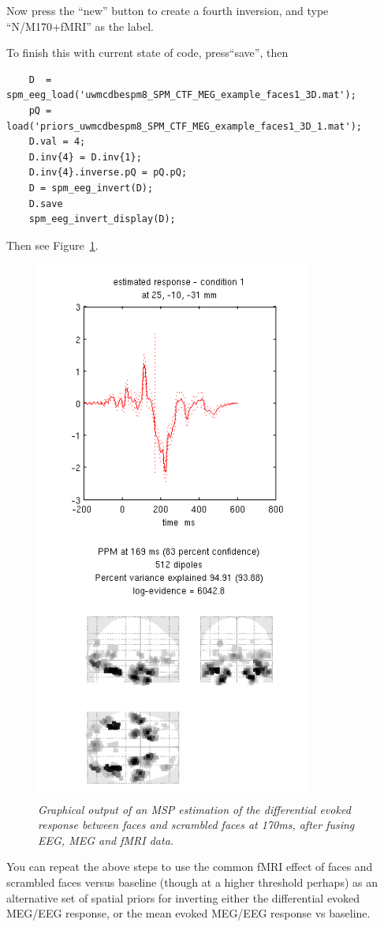 Now press the ``new'' button to create a fourth inversion, and type ``N/M170+fMRI'' as the label.

To finish this with current state of code, press``save'', then 
\begin{verbatim}
	D  = spm_eeg_load('uwmcdbespm8_SPM_CTF_MEG_example_faces1_3D.mat');
	pQ = load('priors_uwmcdbespm8_SPM_CTF_MEG_example_faces1_3D_1.mat');
	D.val = 4;
	D.inv{4} = D.inv{1};
	D.inv{4}.inverse.pQ = pQ.pQ;
	D = spm_eeg_invert(D);
	D.save
	spm_eeg_invert_display(D);
\end{verbatim}

Then see Figure~\ref{multimodal:fusion:fig:4}.


\begin{figure}
\begin{center}
\includegraphics[width=90mm]{multimodal/figures/fused_eeg_meg_msp_fmri.png}
\caption{\em Graphical output of an MSP estimation of the differential evoked response between faces and scrambled faces at 170ms, after fusing EEG, MEG and fMRI data. \label{multimodal:fusion:fig:4}}
\end{center}
\end{figure}

You can repeat the above steps to use the common fMRI effect of faces and scrambled faces versus baseline (though at a higher threshold perhaps) as an alternative set of spatial priors for inverting either the differential evoked MEG/EEG response, or the mean evoked MEG/EEG response vs baseline.
